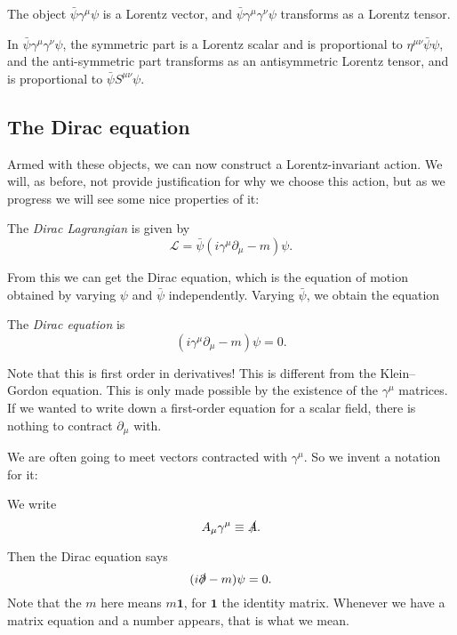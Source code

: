 \documentclass[a4paper]{article}
\begin{document}
\begin{cor}
  The object $\bar{\psi} \gamma^\mu \psi$ is a Lorentz vector, and $\bar\psi \gamma^\mu \gamma^\nu \psi$ transforms as a Lorentz tensor.
\end{cor}

In $\bar\psi \gamma^\mu \gamma^\nu \psi$, the symmetric part is a Lorentz scalar and is proportional to $\eta^{\mu\nu} \bar\psi \psi$, and the anti-symmetric part transforms as an antisymmetric Lorentz tensor, and is proportional to $\bar\psi S^{\mu\nu} \psi$.

\subsection{The Dirac equation}
Armed with these objects, we can now construct a Lorentz-invariant action. We will, as before, not provide justification for why we choose this action, but as we progress we will see some nice properties of it:
\begin{defi}
  The \emph{Dirac Lagrangian} is given by
  \[
    \mathcal{L} = \bar\psi (i \gamma^\mu \partial_\mu - m)\psi.
  \]
\end{defi}
From this we can get the Dirac equation, which is the equation of motion obtained by varying $\psi$ and $\bar\psi$ independently. Varying $\bar\psi$, we obtain the equation
\begin{defi}
  The \emph{Dirac equation} is
  \[
    (i \gamma^\mu \partial_\mu - m)\psi = 0.
  \]
\end{defi}
Note that this is first order in derivatives! This is different from the Klein--Gordon equation. This is only made possible by the existence of the $\gamma^\mu$ matrices. If we wanted to write down a first-order equation for a scalar field, there is nothing to contract $\partial_\mu$ with.

We are often going to meet vectors contracted with $\gamma^\mu$. So we invent a notation for it:
\begin{notation}\index{$\slashed\psi$}
  We write
  \[
    A_\mu \gamma^\mu \equiv \slashed A.
  \]
\end{notation}
Then the Dirac equation says
\[
  (i \slashed\partial - m) \psi = 0.
\]
Note that the $m$ here means $m\mathbf{1}$, for $\mathbf{1}$ the identity matrix. Whenever we have a matrix equation and a number appears, that is what we mean.
\end{document}
